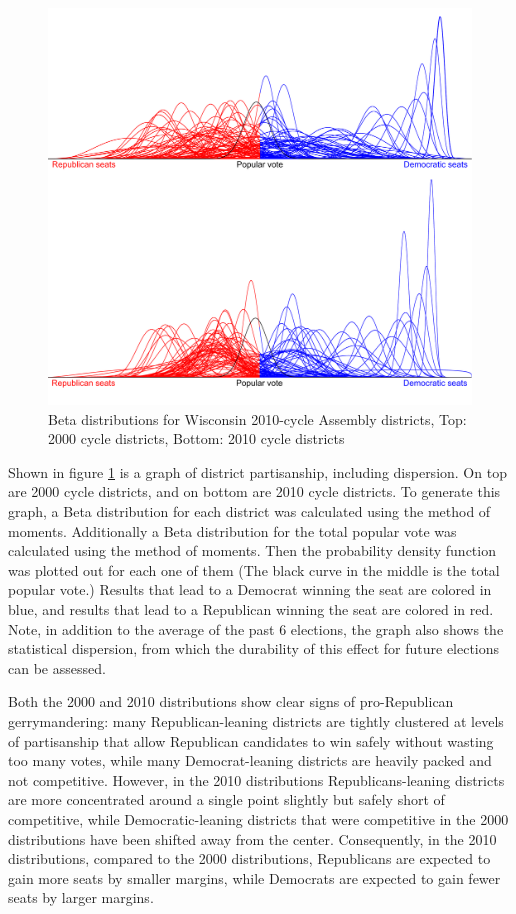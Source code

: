 \documentclass[preprint,12pt]{article}
\begin{document}
\begin{figure}[htb!]
    \begin{center}
        \includegraphics[scale=0.25]{../Figures/WI_compared/Betas_cropped.png}
        \caption{Beta distributions for Wisconsin 2010-cycle Assembly districts, Top: 2000 cycle districts, Bottom: 2010 cycle districts}\label{fig:BetasWI}
    \end{center}
\end{figure}
 
Shown in figure \ref{fig:BetasWI} is a graph of district partisanship, including dispersion. 
On top are 2000 cycle districts, and on bottom are 2010 cycle districts.   
To generate this graph, a Beta distribution for each district was calculated using the method of moments.  Additionally a Beta distribution for the total popular vote was calculated using the method of moments.  Then the probability density function was plotted out for each one of them (The black curve in the middle is the total popular vote.)
Results that lead to a Democrat winning the seat are colored in blue, and results that lead to a Republican winning the seat are colored in red.
Note, in addition to the average of the past 6 elections, the graph also shows the statistical dispersion, from which the durability of this effect for future elections can be assessed.

Both the 2000 and 2010 distributions show clear signs of pro-Republican gerrymandering: many Republican-leaning districts are tightly clustered at levels of partisanship that allow Republican candidates to win safely without wasting too many votes, while many Democrat-leaning districts are heavily packed and not competitive.
However, in the 2010 distributions Republicans-leaning districts are more concentrated around a single point slightly but safely short of competitive, while Democratic-leaning districts that were competitive in the 2000 distributions have been shifted away from the center.
Consequently, in the 2010 distributions, compared to the 2000 distributions, Republicans are expected to gain more seats by smaller margins, while Democrats are expected to gain fewer seats by larger margins.
\end{document}
